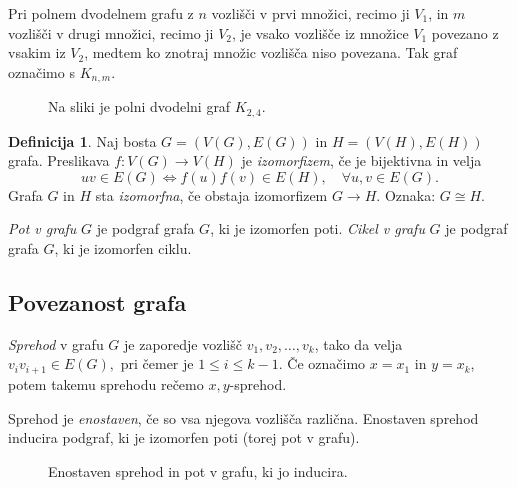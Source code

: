 \documentclass[12pt,a4paper]{amsart}
\theoremstyle{definition} %
\newtheorem{definicija}{Definicija}[section]
\theoremstyle{plain} %
\newcommand{\N}{\mathbb N}
\newcommand{\graf}[1][G]{\ensuremath{#1 = (V(#1), E(#1))}}
\newcommand{\vozlisca}[1][G]{\ensuremath{V(#1)}}
\newcommand{\povezave}[1][G]{\ensuremath{E(#1)}}
\begin{document}
Pri polnem dvodelnem grafu z $n$ vozlišči v prvi množici, recimo ji $V_1$, in $m$ vozlišči v drugi množici, recimo ji $V_2$, je vsako vozlišče iz množice $V_1$ povezano z vsakim iz $V_2$, medtem ko znotraj množic vozlišča niso povezana. Tak graf označimo s $K_{n,m}$.

\begin{figure}[h]
    \caption{Na sliki je polni dvodelni graf $K_{2,4}$.}
\end{figure}

\begin{definicija}
	Naj bosta $\graf$ in $\graf[H]$ grafa. 
	Preslikava $f\colon \vozlisca \to \vozlisca[H]$ je \emph{izomorfizem}, če je bijektivna in velja
	\[ uv \in \povezave \iff f(u)f(v) \in \povezave[H],\quad \forall u, v \in \povezave. \]
	Grafa $G$ in $H$ sta \emph{izomorfna}, če obstaja izomorfizem $G \to H$. Oznaka: $G \cong H$.
\end{definicija}

\emph{Pot v grafu} $G$ je podgraf grafa $G$, ki je izomorfen poti.
\emph{Cikel v grafu} $G$ je podgraf grafa $G$, ki je izomorfen ciklu. 

\subsection{Povezanost grafa}

\emph{Sprehod} v grafu $G$ je zaporedje vozlišč $v_1, v_2, \ldots, v_k$, tako da velja $v_i v_{i+1} \in E(G),$ pri čemer je $1 \leq i \leq k-1$. Če označimo $x = x_1$ in $y = x_k$, potem takemu sprehodu rečemo $x,y$-sprehod.

Sprehod je \emph{enostaven}, če so vsa njegova vozlišča različna. Enostaven sprehod inducira podgraf, ki je izomorfen poti (torej pot v grafu).

\begin{figure}[h]
    \caption{Enostaven sprehod in pot v grafu, ki jo inducira.}
\end{figure}
\end{document}
